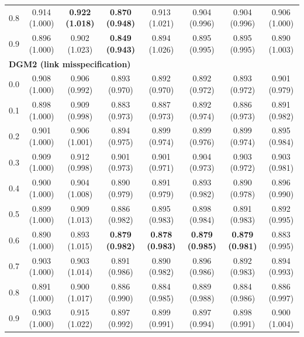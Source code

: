 \begin{table}[!h]
{\begin{tabular}[t]{|c|ccccccc|}
\hspace{1em}0.8 & 0.914 (1.000) & \textbf{0.922 (1.018)} & \textbf{0.870 (0.948)} & 0.913 (1.021) & 0.904 (0.996) & 0.904 (0.996) & 0.906 (1.000)\\
\hspace{1em}0.9 & 0.896 (1.000) & 0.902 (1.023) & \textbf{0.849 (0.943)} & 0.894 (1.026) & 0.895 (0.995) & 0.895 (0.995) & 0.890 (1.003)\\
\hline
\multicolumn{8}{|l|}{\textbf{DGM2 (link misspecification)}}\\
\hspace{1em}0.0 & 0.908 (1.000) & 0.906 (0.992) & 0.893 (0.970) & 0.892 (0.970) & 0.892 (0.972) & 0.893 (0.972) & 0.901 (0.979)\\
\hspace{1em}0.1 & 0.898 (1.000) & 0.909 (0.998) & 0.883 (0.973) & 0.887 (0.973) & 0.892 (0.974) & 0.886 (0.973) & 0.891 (0.982)\\
\hspace{1em}0.2 & 0.901 (1.000) & 0.906 (1.001) & 0.894 (0.975) & 0.899 (0.974) & 0.899 (0.976) & 0.899 (0.974) & 0.895 (0.984)\\
\hspace{1em}0.3 & 0.909 (1.000) & 0.912 (0.998) & 0.901 (0.973) & 0.901 (0.971) & 0.904 (0.973) & 0.903 (0.972) & 0.903 (0.981)\\
\hspace{1em}0.4 & 0.900 (1.000) & 0.904 (1.008) & 0.890 (0.979) & 0.891 (0.979) & 0.893 (0.982) & 0.890 (0.978) & 0.896 (0.990)\\
\hspace{1em}0.5 & 0.899 (1.000) & 0.909 (1.013) & 0.886 (0.982) & 0.895 (0.983) & 0.898 (0.984) & 0.891 (0.983) & 0.892 (0.995)\\
\hspace{1em}0.6 & 0.890 (1.000) & 0.893 (1.015) & \textbf{0.879 (0.982)} & \textbf{0.878 (0.983)} & \textbf{0.879 (0.985)} & \textbf{0.879 (0.981)} & 0.883 (0.995)\\
\hspace{1em}0.7 & 0.903 (1.000) & 0.903 (1.014) & 0.891 (0.986) & 0.890 (0.982) & 0.896 (0.986) & 0.892 (0.983) & 0.894 (0.993)\\
\hspace{1em}0.8 & 0.891 (1.000) & 0.900 (1.017) & 0.886 (0.990) & 0.884 (0.985) & 0.889 (0.988) & 0.884 (0.986) & 0.886 (0.997)\\
\hspace{1em}0.9 & 0.903 (1.000) & 0.915 (1.022) & 0.897 (0.992) & 0.899 (0.991) & 0.897 (0.994) & 0.898 (0.991) & 0.900 (1.004)\\

\end{tabular}}
\end{table}
